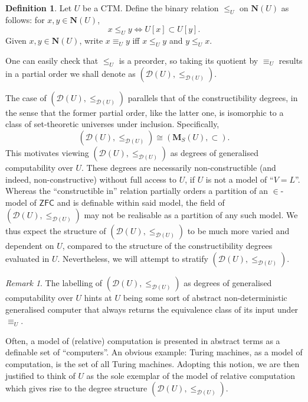 \documentclass[12pt, twoside]{memoir}
\numberwithin{equation}{section}
\theoremstyle{definition}
\newtheorem{defi}[thm]{Definition}
\theoremstyle{remark}
\newtheorem{rem}[thm]{Remark}
\theoremstyle{definition}
\theoremstyle{definition}
\theoremstyle{definition}
\theoremstyle{remark}
\begin{document}
\begin{defi}\label{def9111}
Let $U$ be a CTM. Define the binary relation $\leq_U$ on $\mathbf{N}(U)$ as follows: for $x, y \in \mathbf{N}(U)$,
\begin{equation*}
    x \leq_U y \iff U[x] \subset U[y] \text{.}
\end{equation*}
Given $x, y \in \mathbf{N}(U)$, write $x \equiv_U y$ iff $x \leq_U y$ and $y \leq_U x$.
\end{defi}

One can easily check that $\leq_U$ is a preorder, so taking its quotient by $\equiv_U$ results in a partial order we shall denote as $(\mathcal{D}(U), \leq_{\mathcal{D}(U)})$.

The case of $(\mathcal{D}(U), \leq_{\mathcal{D}(U)})$ parallels that of the constructibility degrees, in the sense that the former partial order, like the latter one, is isomorphic to a class of set-theoretic universes under inclusion. Specifically, 
\begin{equation*}
   (\mathcal{D}(U), \leq_{\mathcal{D}(U)}) \cong (\mathbf{M}_S(U), \subset) \text{.} 
\end{equation*} 
This motivates viewing $(\mathcal{D}(U), \leq_{\mathcal{D}(U)})$ as degrees of generalised computability over $U$. These degrees are necessarily non-constructible (and indeed, non-constructive) without full access to $U$, if $U$ is not a model of ``$V = L$''. Whereas the ``constructible in'' relation partially orders a partition of an $\in$-model of $\mathsf{ZFC}$ and is definable within said model, the field of $(\mathcal{D}(U), \leq_{\mathcal{D}(U)})$ may not be realisable as a partition of any such model. We thus expect the structure of $(\mathcal{D}(U), \leq_{\mathcal{D}(U)})$ to be much more varied and dependent on $U$, compared to the structure of the constructibility degrees evaluated in $U$. Nevertheless, we will attempt to stratify $(\mathcal{D}(U), \leq_{\mathcal{D}(U)})$.

\begin{rem}\label{rem9112}
The labelling of $(\mathcal{D}(U), \leq_{\mathcal{D}(U)})$ as degrees of generalised computability over $U$ hints at $U$ being some sort of abstract non-deterministic generalised computer that always returns the equivalence class of its input under $\equiv_U$. 

Often, a model of (relative) computation is presented in abstract terms as a definable set of ``computers''. An obvious example: Turing machines, as a model of computation, is the set of all Turing machines. Adopting this notion, we are then justified to think of $U$ as the sole exemplar of the model of relative computation which gives rise to the degree structure $(\mathcal{D}(U), \leq_{\mathcal{D}(U)})$.
\end{rem}
\end{document}
